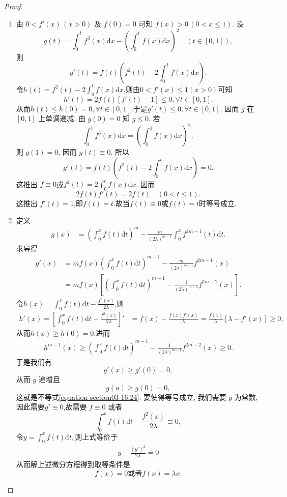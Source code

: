 \documentclass[../../main.tex]{subfiles}
\begin{document}
\begin{proof}
\begin{enumerate}
\item 由 $0<f'(x)\,(x>0)$ 及 $f(0)=0$ 可知 $f(x)>0\,(0<x\leqslant 1)$. 设
$$g(t)=\int_0^t f^3(x)\mathrm{d}x-\left(\int_0^t f(x)\mathrm{d}x\right)^2\quad(t\in[0,1]),$$
则
$$g'(t)=f(t)\left(f^2(t)-2\int_0^t f(x)\mathrm{d}x\right).$$
令$h(t)=f^2(t)-2\int_0^t f(x)\mathrm{d}x$,则由$0<f'(x)\leqslant 1(x>0)$可知
\[
h' \left( t \right) =2f\left( t \right) \left[ f' \left( t \right) -1 \right] \leqslant 0,\forall t\in \left[ 0,1 \right] .
\]
从而$h(t)\leqslant h(0)=0,\forall t\in \left[ 0,1 \right] $.于是$g'(t)\leqslant 0,\forall t\in \left[ 0,1 \right]$.
因而 $g$ 在 $[0,1]$ 上单调递减. 由 $g(0)=0$ 知 $g\leqslant 0$. 若
$$\int_0^1 f^3(x)\mathrm{d}x=\left(\int_0^1 f(x)\mathrm{d}x\right)^2,$$
则 $g(1)=0$, 因而 $g(t)\equiv0$. 所以
$$g'(t)=f(t)\left(f^2(t)-2\int_0^t f(x)\mathrm{d}x\right)=0.$$
这推出 $f\equiv 0$或$f^2(t)=2\int_0^t f(x)\mathrm{d}x$. 因而
$$2f(t)f'(t)=2f(t)\quad(0<t\leqslant 1).$$
这推出 $f'(t)=1$,即$f(t)=t$.故当$f(t)\equiv 0$或$f(t)=t$时等号成立.

\item 定义
\begin{align*}
g(x) &= \left(\int_{0}^{x}f(t)\mathrm{d}t\right)^m - \frac{m}{(2\lambda)^{m - 1}}\int_{0}^{x}f^{2m - 1}(t)\mathrm{d}t.
\end{align*}
求导得
\begin{align*}
g'(x) &= mf(x)\left(\int_{0}^{x}f(t)\mathrm{d}t\right)^{m - 1} - \frac{m}{(2\lambda)^{m - 1}}f^{2m - 1}(x)\\
&= mf(x)\left[\left(\int_{0}^{x}f(t)\mathrm{d}t\right)^{m - 1} - \frac{1}{(2\lambda)^{m - 1}}f^{2m - 2}(x)\right].
\end{align*}
令$h(x)=\int_{0}^{x}f(t)\mathrm{d}t - \frac{f^2(x)}{2\lambda}$,则
\begin{align*}
h'(x)=\left[\int_{0}^{x}f(t)\mathrm{d}t - \frac{f^2(x)}{2\lambda}\right]' &= f(x) - \frac{f(x)f'(x)}{\lambda} = \frac{f(x)}{\lambda}[\lambda - f'(x)] \geqslant 0,
\end{align*}
从而$h(x)\geqslant  h(0)=0.$进而
\begin{align*}
h^{m-1}(x)\geqslant \left(\int_{0}^{x}f(t)\mathrm{d}t\right)^{m - 1} - \frac{1}{(2\lambda)^{m - 1}}f^{2m - 2}(x)\geqslant 0.
\end{align*}
于是我们有
\[g'(x) \geqslant g'(0) = 0,\]
从而 $g$ 递增且
\[g(a) \geqslant g(0) = 0,\]
这就是不等式\eqref{equation-section03-16.24}.
要使得等号成立, 我们需要 $g$ 为常数, 因此需要$g'\equiv 0$,故需要 $f \equiv 0$ 或者
\[\int_{0}^{x}f(t)\mathrm{d}t - \frac{f^2(x)}{2\lambda} \equiv 0,\]
令$y=\int_{0}^{x}f(t)\mathrm{d}t,$则上式等价于
\begin{align*}
y-\frac{(y')^2}{2\lambda}=0
\end{align*}
从而解上述微分方程得到取等条件是
\[f(x) = 0\text{或者}f(x) = \lambda x.\]
\end{enumerate}

\end{proof}
\end{document}
